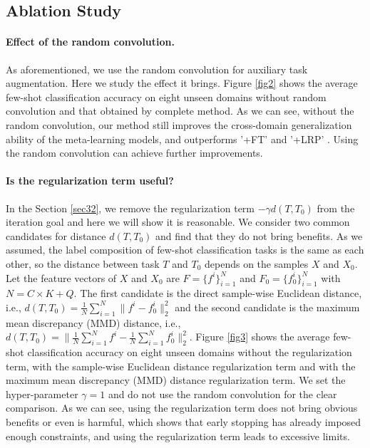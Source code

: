 \documentclass{article}
\begin{document}
\subsection{Ablation Study}\label{AS}
\paragraph{Effect of the random convolution.}As aforementioned, we use the random convolution for auxiliary task augmentation. Here we study the effect it brings. Figure \ref{fig2} shows the average few-shot classification accuracy on eight unseen domains without random convolution and that obtained by complete method. As we can see, without the random convolution, our method still improves the cross-domain generalization ability of the meta-learning models, and outperforms '+FT' \cite{DBLP:conf/iclr/TsengLH020} and '+LRP' \cite{sun2020explanation}. Using the random convolution can achieve further improvements.

\paragraph{Is the regularization term useful?}In the Section \ref{sec32}, we remove the regularization term $-\gamma d(T,T_0)$ from the iteration goal and here we will show it is reasonable. We consider two common candidates for distance $d(T,T_0)$ and find that they do not bring benefits. As we assumed, the label composition of few-shot classification tasks is the same as each other, so the distance between task $T$ and $T_0$ depends on the samples $X$ and $X_0$. Let the feature vectors of $X$ and $X_0$ are $F=\{f^i\}_{i=1}^N$ and $F_0=\{f_0^i\}_{i=1}^N$ with $N=C\times K+Q$. The first candidate is the direct sample-wise Euclidean distance, i.e., $d(T,T_0)=\frac{1}{N}\sum_{i=1}^N\|f^i-f_0^i\|_2^2$ and the second candidate is the maximum mean discrepancy (MMD) distance, i.e., $d(T,T_0)=\|\frac{1}{N}\sum_{i=1}^Nf^i-\frac{1}{N}\sum_{i=1}^Nf_0^i\|_2^2$. Figure \ref{fig3} shows the average few-shot classification accuracy on eight unseen domains without the regularization term, with the sample-wise Euclidean distance regularization term and with the maximum mean discrepancy (MMD) distance regularization term. We set the hyper-parameter $\gamma=1$ and do not use the random convolution for the clear comparison. As we can see, using the regularization term does not bring obvious benefits or even is harmful, which shows that early stopping has already imposed enough constraints, and using the regularization term leads to excessive limits.
\end{document}
